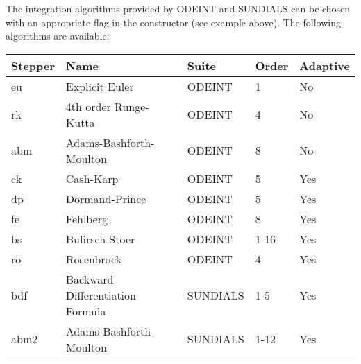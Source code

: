 The integration algorithms provided by ODEINT and SUNDIALS can be chosen with an appropriate flag in the constructor (see example above).
The following algorithms are available:

\begin{center}

\begin{tabular}{|l|l|l|l|l|}
\hline 
Stepper & Name & Suite & Order & Adaptive \\ 
\hline 
eu & Explicit Euler & ODEINT & 1 & No  \\ 
\hline 
rk & 4th order Runge-Kutta & ODEINT & 4 & No  \\ 
\hline 
abm & Adams-Bashforth-Moulton & ODEINT & 8 & No  \\ 
\hline 
ck & Cash-Karp & ODEINT & 5 & Yes  \\ 
\hline 
dp & Dormand-Prince & ODEINT & 5 & Yes  \\ 
\hline 
fe & Fehlberg & ODEINT & 8 & Yes  \\ 
\hline 
bs & Bulirsch Stoer & ODEINT & 1-16 & Yes  \\ 
\hline 
ro & Rosenbrock & ODEINT & 4 & Yes  \\ 
\hline 
bdf & Backward Differentiation Formula & SUNDIALS & 1-5 & Yes  \\ 
\hline 
abm2 & Adams-Bashforth-Moulton & SUNDIALS & 1-12 & Yes \\ 
\hline 
\end{tabular} 

\end{center}
